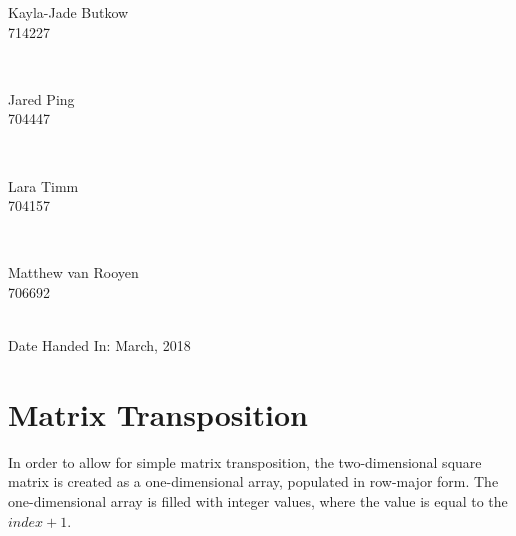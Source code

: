\documentclass[10pt,twocolumn]{witseiepaper}
\begin{document}
\begin{titlepage}
		
		\begin{minipage}{0.4\textwidth}
			\begin{flushleft} \large
				Kayla-Jade Butkow \\ 714227 %
			\end{flushleft}
		\end{minipage}
		~
		\begin{minipage}{0.4\textwidth}
			\begin{flushright} \large
				Jared Ping \\ 704447
			\end{flushright}
		\end{minipage}\\[1cm]
		
		\begin{minipage}{0.4\textwidth}
			\begin{flushleft} \large
				Lara Timm \\ 704157
			\end{flushleft}
		\end{minipage}
		~
		\begin{minipage}{0.4\textwidth}
			\begin{flushright} \large
				Matthew van Rooyen \\ 706692
			\end{flushright}
		\end{minipage}\\[1cm]
		
		
		
		{\large Date Handed In:  March, 2018}\\[1cm] 
		
	\end{titlepage}


\pagestyle{plain}
\setcounter{page}{1}
\onecolumn
%
\section{Matrix Transposition}
In order to allow for simple matrix transposition, the two-dimensional square matrix is created as a one-dimensional array, populated in row-major form. The one-dimensional array is filled with integer values, where the value is equal to the $index + 1$.
\end{document}
